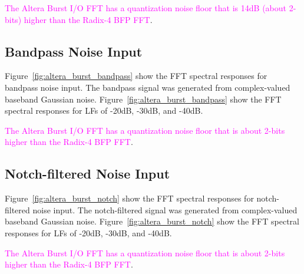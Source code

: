 \textcolor{magenta}{The Altera Burst I/O FFT has a quantization noise floor
that is 14dB (about 2-bits) higher than the Radix-4 BFP FFT}.

\subsection{Bandpass Noise Input}

Figure~\ref{fig:altera_burst_bandpass} show the FFT spectral responses for
bandpass noise input. The bandpass signal was generated from complex-valued
baseband Gaussian noise.
%
Figure~\ref{fig:altera_burst_bandpass} show the FFT spectral responses for
LFs of -20dB, -30dB, and -40dB.

\textcolor{magenta}{The Altera Burst I/O FFT has a quantization noise floor
that is about 2-bits higher than the Radix-4 BFP FFT}.

\subsection{Notch-filtered Noise Input}

Figure~\ref{fig:altera_burst_notch} show the FFT spectral responses for
notch-filtered noise input. The notch-filtered signal was generated from
complex-valued baseband Gaussian noise.
%
Figure~\ref{fig:altera_burst_notch} show the FFT spectral responses for
LFs of -20dB, -30dB, and -40dB.

\textcolor{magenta}{The Altera Burst I/O FFT has a quantization noise floor
that is about 2-bits higher than the Radix-4 BFP FFT}.

